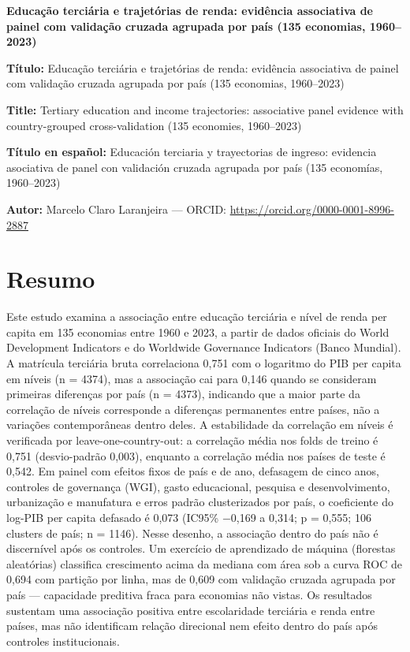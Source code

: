 \documentclass[12pt,a4paper]{article}
\begin{document}
\begin{center}
{\Large\bfseries Educação terciária e trajetórias de renda: evidência associativa de painel com validação cruzada agrupada por país (135 economias, 1960--2023)}
\end{center}

\noindent\textbf{Título:} Educação terciária e trajetórias de renda: evidência associativa de painel com validação cruzada agrupada por país (135 economias, 1960--2023)

\noindent\textbf{Title:} Tertiary education and income trajectories: associative panel evidence with country-grouped cross-validation (135 economies, 1960--2023)

\noindent\textbf{Título en español:} Educación terciaria y trayectorias de ingreso: evidencia asociativa de panel con validación cruzada agrupada por país (135 economías, 1960--2023)

\noindent\textbf{Autor:} Marcelo Claro Laranjeira --- ORCID: \href{https://orcid.org/0000-0001-8996-2887}{https://orcid.org/0000-0001-8996-2887}

\vspace{0.8cm}

\section*{Resumo}

Este estudo examina a associação entre educação terciária e nível de renda per capita em 135 economias entre 1960 e 2023, a partir de dados oficiais do World Development Indicators e do Worldwide Governance Indicators (Banco Mundial). A matrícula terciária bruta correlaciona 0,751 com o logaritmo do PIB per capita em níveis (n = 4374), mas a associação cai para 0,146 quando se consideram primeiras diferenças por país (n = 4373), indicando que a maior parte da correlação de níveis corresponde a diferenças permanentes entre países, não a variações contemporâneas dentro deles. A estabilidade da correlação em níveis é verificada por leave-one-country-out: a correlação média nos folds de treino é 0,751 (desvio-padrão 0,003), enquanto a correlação média nos países de teste é 0,542. Em painel com efeitos fixos de país e de ano, defasagem de cinco anos, controles de governança (WGI), gasto educacional, pesquisa e desenvolvimento, urbanização e manufatura e erros padrão clusterizados por país, o coeficiente do log-PIB per capita defasado é 0,073 (IC95\% $-$0,169 a 0,314; p = 0,555; 106 clusters de país; n = 1146). Nesse desenho, a associação dentro do país não é discernível após os controles. Um exercício de aprendizado de máquina (florestas aleatórias) classifica crescimento acima da mediana com área sob a curva ROC de 0,694 com partição por linha, mas de 0,609 com validação cruzada agrupada por país --- capacidade preditiva fraca para economias não vistas. Os resultados sustentam uma associação positiva entre escolaridade terciária e renda entre países, mas não identificam relação direcional nem efeito dentro do país após controles institucionais.
\end{document}
